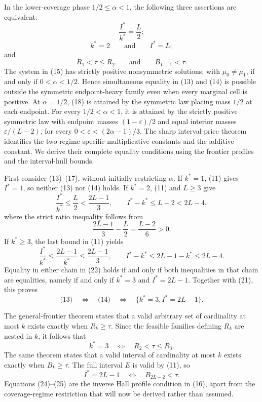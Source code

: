 In the lower-coverage phase \(1/2\leq\alpha<1\), the following three assertions are equivalent:
\[
 \frac{I^*}{k^*}=\frac L2; \tag{18}
\]
\[
 k^*=2\qquad\text{and}\qquad I^*=L; \tag{19}
\]
and
\[
 R_1<\tau\leq R_2\qquad\text{and}\qquad B_{L-1}<\tau. \tag{20}
\]
The system in (15) has strictly positive nonsymmetric solutions, with \(\mu_0\neq\mu_1\), if and only if \(0<\alpha<1/2\).  Hence simultaneous equality in (13) and (14) is possible outside the symmetric endpoint-heavy family even when every marginal cell is positive.  At \(\alpha=1/2\), (18) is attained by the symmetric law placing mass \(1/2\) at each endpoint.  For every \(1/2<\alpha<1\), it is attained by the strictly positive symmetric law with endpoint masses \((1-\varepsilon)/2\) and equal interior masses \(\varepsilon/(L-2)\), for every \(0<\varepsilon<(2\alpha-1)/3\).
The sharp interval-price theorem identifies the two regime-specific multiplicative constants and the additive constant.  We derive their complete equality conditions using the frontier profiles and the interval-hull bounds.

First consider (13)--(17), without initially restricting \(\alpha\).  If \(k^*=1\), (11) gives \(I^*=1\), so neither (13) nor (14) holds.  If \(k^*=2\), (11) and \(L\geq3\) give
\[
 \frac{I^*}{k^*}\leq\frac L2<\frac{2L-1}{3},
 \qquad
 I^*-k^*\leq L-2<2L-4, \tag{21}
\]
where the strict ratio inequality follows from
\[
 \frac{2L-1}{3}-\frac L2=\frac{L-2}{6}>0.
\]
If \(k^*\geq3\), the last bound in (11) yields
\[
 \frac{I^*}{k^*}\leq\frac{2L-1}{k^*}\leq\frac{2L-1}{3},
 \qquad
 I^*-k^*\leq2L-1-k^*\leq2L-4. \tag{22}
\]
Equality in either chain in (22) holds if and only if both inequalities in that chain are equalities, namely if and only if \(k^*=3\) and \(I^*=2L-1\).  Together with (21), this proves
\[
 \text{(13)}\quad\Longleftrightarrow\quad
 \text{(14)}\quad\Longleftrightarrow\quad
 \{k^*=3, I^*=2L-1\}. \tag{23}
\]

The general-frontier theorem states that a valid arbitrary set of cardinality at most \(k\) exists exactly when \(R_k\geq\tau\).  Since the feasible families defining \(R_k\) are nested in \(k\), it follows that
\[
 k^*=3\quad\Longleftrightarrow\quad R_2<\tau\leq R_3. \tag{24}
\]
The same theorem states that a valid interval of cardinality at most \(k\) exists exactly when \(B_k\geq\tau\).  The full interval \(E\) is valid by (11), so
\[
 I^*=2L-1\quad\Longleftrightarrow\quad B_{2L-2}<\tau. \tag{25}
\]
Equations (24)--(25) are the inverse Hall profile condition in (16), apart from the coverage-regime restriction that will now be derived rather than assumed.

